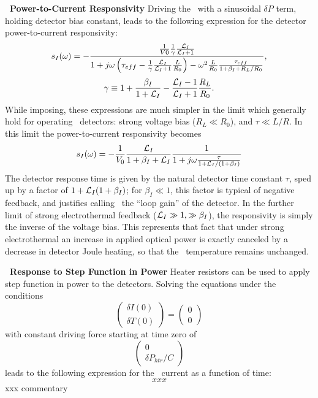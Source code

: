 \textbf{\TES\ Power-to-Current Responsivity}
Driving the \TES\ with a sinusoidal $\delta P$ term, holding detector bias constant, leads to the following expression for the detector power-to-current responsivity:
\begin{equation}\label{eqn:si-full}
s_I(\omega) = 
- \frac{ \frac{1}{V0} \frac{1}{\gamma} \frac{\mathcal{L}_I}{\mathcal{L}_I + 1} }
       { 1 + j \omega \left( \tau_{eff} - \frac{1}{\gamma}\frac{\mathcal{L}_I}{\mathcal{L}_I + 1} \frac{L}{R_0}\right) - \omega^2 \frac{L}{R_0}\frac{\tau_{eff}}{1 + \beta_I + R_L / R_0}},
\end{equation}
\begin{equation}
\gamma \equiv 1 + \frac{\beta_I}{1+\mathcal{L}_I} - \frac{\mathcal{L}_I - 1}{\mathcal{L}_I + 1}\frac{R_L}{R_0}.
\end{equation}
While imposing, these expressions are much simpler in the limit which generally hold for operating \TES\ detectors: strong voltage bias ($R_L \ll R_0$), and $\tau \ll L/R$. 
In this limit the power-to-current responsivity becomes
\begin{equation}
s_I(\omega) = -\frac{1}{V_0} \frac{\mathcal{L}_I}{1+\beta_I + \mathcal{L}_I} \frac{1}{1 + j \omega \frac{\tau}{1 +\mathcal{L}_I/(1+\beta_I)}}
\end{equation}
The detector response time is given by the natural detector time constant $\tau$, sped up by a factor of $1 + \mathcal{L}_I(1+\beta_I)$; for $\beta_I \ll 1$, this factor is typical of negative feedback, and justifies calling \Loop\ the ``loop gain'' of the detector.
In the further limit of strong electrothermal feedback ($\mathcal{L}_I \gg 1, \gg \beta_I$), the \DC responsivity is simply the inverse of the voltage bias.
This represents that fact that under strong electrothermal an increase in applied optical power is exactly canceled by a decrease in detector Joule heating, so that the \TES\ temperature remains unchanged.

\textbf{\TES\ Response to Step Function in Power}
Heater resistors can be used to apply step function in power to the detectors.
Solving the equations under the conditions
\begin{equation}
\begin{pmatrix} \delta I(0) \\ \delta T(0) \end{pmatrix} = \begin{pmatrix} 0 \\ 0 \end{pmatrix}
\end{equation}
with constant driving force starting at time zero of
\begin{equation}
\begin{pmatrix} 0 \\ \delta P_{htr} / C \end{pmatrix}
\end{equation}
leads to the following expression for the \TES\ current as a function of time:
\begin{equation}
xxx
\end{equation}
xxx commentary

